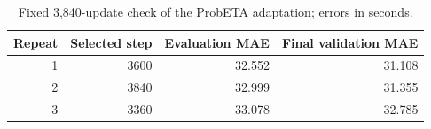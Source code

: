 \begin{table}[t]
\centering\footnotesize\setlength{\tabcolsep}{4pt}
\caption{Fixed 3,840-update check of the ProbETA adaptation; errors in seconds.}\label{tab:probeta_extended}
\begin{tabular}{rrrr}\toprule
Repeat & Selected step & Evaluation MAE & Final validation MAE\\\midrule
1 & 3600 & 32.552 & 31.108\\
2 & 3840 & 32.999 & 31.355\\
3 & 3360 & 33.078 & 32.785\\
\bottomrule\end{tabular}
\end{table}
